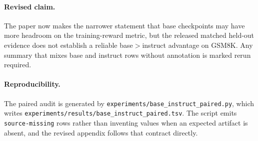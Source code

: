 \paragraph{Revised claim.}
The paper now makes the narrower statement that base checkpoints may have
more headroom on the training-reward metric, but the released matched
held-out evidence does not establish a reliable base$>$instruct advantage on
GSM8K. Any summary that mixes base and instruct rows without annotation is
marked rerun required.

\paragraph{Reproducibility.}
The paired audit is generated by
\texttt{experiments/base\_instruct\_paired.py}, which writes
\texttt{experiments/results/base\_instruct\_paired.tsv}. The script emits
\texttt{source-missing} rows rather than inventing values when an expected
artifact is absent, and the revised appendix follows that contract directly.
